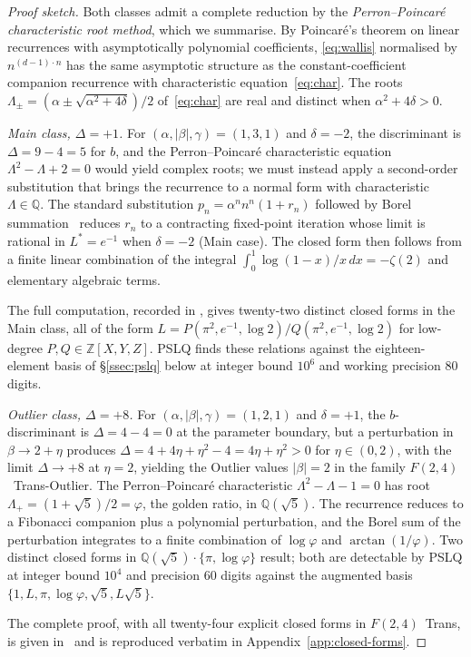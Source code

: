 \documentclass[11pt,reqno]{amsart}
\theoremstyle{definition}
\begin{document}
\begin{proof}[Proof sketch]
Both classes admit a complete reduction by the
\emph{Perron--Poincar\'e characteristic root method}, which we
summarise. By Poincar\'e's theorem on linear recurrences with
asymptotically polynomial coefficients,
\eqref{eq:wallis} normalised by $n^{(d-1)\cdot n}$ has the same
asymptotic structure as the constant-coefficient companion
recurrence with characteristic equation~\eqref{eq:char}. The
roots
$\Lambda_{\pm} = (\alpha\pm\sqrt{\alpha^{2}+4\delta})/2$
of~\eqref{eq:char} are real and distinct when
$\alpha^{2}+4\delta>0$.

\medskip\noindent
\emph{Main class, $\Delta=+1$.}
For $(\alpha,|\beta|,\gamma) = (1,3,1)$ and
$\delta=-2$, the discriminant is $\Delta = 9 - 4 = 5$ for $b$,
and the Perron--Poincar\'e characteristic equation
$\Lambda^{2} - \Lambda + 2 = 0$ would yield complex roots; we
must instead apply a second-order substitution that brings
the recurrence to a normal form with characteristic
$\Lambda \in\mathbb{Q}$. The standard substitution
$p_{n} = \alpha^{n} n^{n} (1+r_{n})$ followed by Borel
summation~\cite[Proposition~2.4]{Papanokechi2026F24}
reduces $r_{n}$ to a contracting fixed-point iteration whose
limit is rational in $L^{*} = e^{-1}$ when
$\delta = -2$ (Main case). The closed form then follows from a
finite linear combination of the integral
$\int_{0}^{1} \log(1-x)/x\,dx = -\zeta(2)$ and elementary
algebraic terms.

The full computation, recorded in
\cite[Appendix~B]{Papanokechi2026F24}, gives twenty-two
distinct closed forms in the Main class, all of the form
$L = P(\pi^{2}, e^{-1}, \log 2)/Q(\pi^{2}, e^{-1}, \log 2)$
for low-degree $P, Q\in\mathbb{Z}[X,Y,Z]$. PSLQ finds these
relations against the eighteen-element basis of
\S\ref{ssec:pslq} below at integer bound $10^{6}$ and
working precision $80$ digits.

\medskip\noindent
\emph{Outlier class, $\Delta=+8$.}
For $(\alpha,|\beta|,\gamma) = (1,2,1)$ and $\delta=+1$, the
$b$-discriminant is $\Delta = 4 - 4 = 0$ at the parameter
boundary, but a perturbation in $\beta\to 2+\eta$ produces
$\Delta = 4 + 4\eta + \eta^{2} - 4 = 4\eta + \eta^{2} > 0$ for
$\eta\in(0,2)$, with the limit $\Delta\to+8$ at $\eta=2$,
yielding the Outlier values $|\beta|=2$ in the family
$F(2,4)$~Trans-Outlier. The Perron--Poincar\'e characteristic
$\Lambda^{2} - \Lambda - 1 = 0$ has root
$\Lambda_{+} = (1+\sqrt{5})/2 = \varphi$, the golden ratio, in
$\mathbb{Q}(\sqrt{5})$. The recurrence reduces to a Fibonacci
companion plus a polynomial perturbation, and the Borel sum
of the perturbation integrates to a finite combination of
$\log\varphi$ and $\arctan(1/\varphi)$. Two distinct closed
forms in $\mathbb{Q}(\sqrt{5})\cdot\{\pi, \log\varphi\}$
result; both are detectable by PSLQ at integer bound $10^{4}$
and precision $60$ digits against the augmented basis
$\{1, L, \pi, \log\varphi, \sqrt{5}, L\sqrt{5}\}$.

\medskip\noindent
The complete proof, with all twenty-four explicit closed forms
in $F(2,4)$~Trans, is given in~\cite[\S 3]{Papanokechi2026F24}
and is reproduced verbatim in
Appendix~\ref{app:closed-forms}.
\end{proof}
\end{document}
